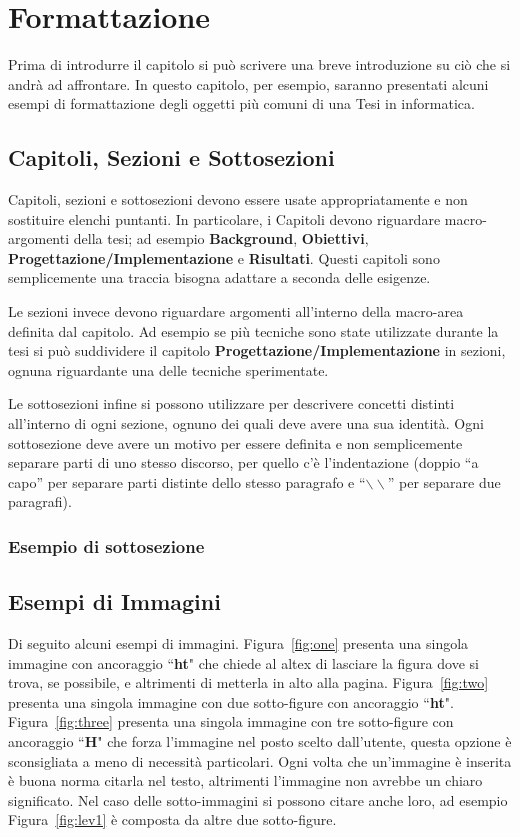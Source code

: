 \chapter{Formattazione}\label{chapter:formattazione}
Prima di introdurre il capitolo si può scrivere una breve introduzione su ciò che si andrà ad affrontare.
In questo capitolo, per esempio, saranno presentati alcuni esempi di formattazione degli oggetti più comuni di una Tesi in informatica.


\section{Capitoli, Sezioni e Sottosezioni}\label{sec:cap_sec_subsec}
Capitoli, sezioni e sottosezioni devono essere usate appropriatamente e non sostituire elenchi puntanti.
In particolare, i Capitoli devono riguardare macro-argomenti della tesi; ad esempio \textbf{Background}, \textbf{Obiettivi}, \textbf{Progettazione/Implementazione} e \textbf{Risultati}.
Questi capitoli sono semplicemente una traccia bisogna adattare a seconda delle esigenze.

Le sezioni invece devono riguardare argomenti all'interno della macro-area definita dal capitolo.
Ad esempio se più tecniche sono state utilizzate durante la tesi si può suddividere il capitolo \textbf{Progettazione/Implementazione} in sezioni, ognuna riguardante una delle tecniche sperimentate.

Le sottosezioni infine si possono utilizzare per descrivere concetti distinti all'interno di ogni sezione, ognuno dei quali deve avere una sua identità.
Ogni sottosezione deve avere un motivo per essere definita e non semplicemente separare parti di uno stesso discorso, per quello c'è l'indentazione (doppio ``a capo'' per separare parti distinte dello stesso paragrafo e ``$\backslash\backslash$'' per separare due paragrafi).

\subsection{Esempio di sottosezione}\label{subsec:es_subsec}
\blindtext

\section{Esempi di Immagini}\label{sec:images}
Di seguito alcuni esempi di immagini.
Figura~\ref{fig:one} presenta una singola immagine con ancoraggio ``\textbf{ht}" che chiede al altex di lasciare la figura dove si trova, se possibile, e altrimenti di metterla in alto alla pagina.
Figura~\ref{fig:two} presenta una singola immagine con due sotto-figure con ancoraggio ``\textbf{ht}".
Figura~\ref{fig:three} presenta una singola immagine con tre sotto-figure con ancoraggio ``\textbf{H}" che forza l'immagine nel posto scelto dall'utente, questa opzione è sconsigliata a meno di necessità particolari.
Ogni volta che un'immagine è inserita è buona norma citarla nel testo, altrimenti l'immagine non avrebbe un chiaro significato.
Nel caso delle sotto-immagini si possono citare anche loro, ad esempio Figura~\ref{fig:lev1} è composta da altre due sotto-figure.

